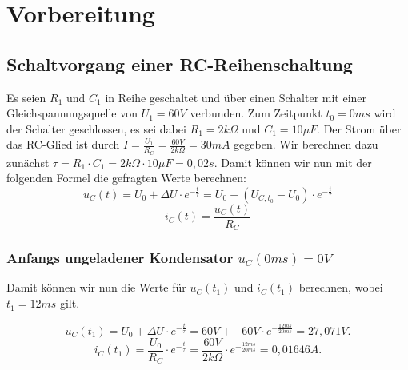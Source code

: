 \documentclass{article}
\begin{document}
\newpage
\thispagestyle{empty}

\tableofcontents


\newpage

\section{Vorbereitung}
\subsection{Schaltvorgang einer RC-Reihenschaltung}
Es seien $R_{1}$ und $C_{1}$ in Reihe geschaltet und über einen Schalter mit einer Gleichspannungsquelle von $U_{1} = 60V$ verbunden. Zum Zeitpunkt $t_{0} = 0ms$ wird der Schalter geschlossen, es sei dabei $R_{1} = 2k\Omega$ und $C_{1} = 10\mu F$. Der Strom über das RC-Glied ist durch $I = \frac{U_{1}}{R_{C}} = \frac{60V}{2k\Omega} = 30mA$ gegeben.
Wir berechnen dazu zunächst $\tau = R_{1} \cdot C_{1} = 2k\Omega \cdot 10\mu F = 0,02 s$. Damit können wir nun mit der folgenden Formel die gefragten Werte berechnen:
\begin{equation}
  \label{eq:1}
  u_{C}(t) = U_{0} + \Delta U \cdot e^{-\frac{t}{\tau}} = U_{0} + (U_{C,t_{0}} - U_{0})\cdot e^{-\frac{t}{\tau}}
\end{equation}
\begin{equation}
  \label{eq:2}
  i_{C}(t) = \frac{u_{C}(t)}{R_{C}}
\end{equation}
\subsubsection{Anfangs ungeladener Kondensator $u_{C}(0ms) = 0V$}
Damit können wir nun die Werte für $u_{C}(t_{1})$ und $i_{C}(t_{1})$ berechnen, wobei $t_{1} = 12ms$ gilt.

\begin{equation*}
  u_{C}(t_{1}) = U_{0}+\Delta U \cdot e^{-\frac{t}{\tau}} = 60V + -60V \cdot e^{-\frac{12ms}{20ms}} = 27,071V.
\end{equation*}
\begin{equation*}
  i_{C}(t_{1}) = \frac{U_{0}}{R_{C}} \cdot e^{-\frac{t}{\tau}} = \frac{60V}{2k\Omega} \cdot e^{-\frac{12ms}{20ms}} = 0,01646A.
\end{equation*}
\end{document}
